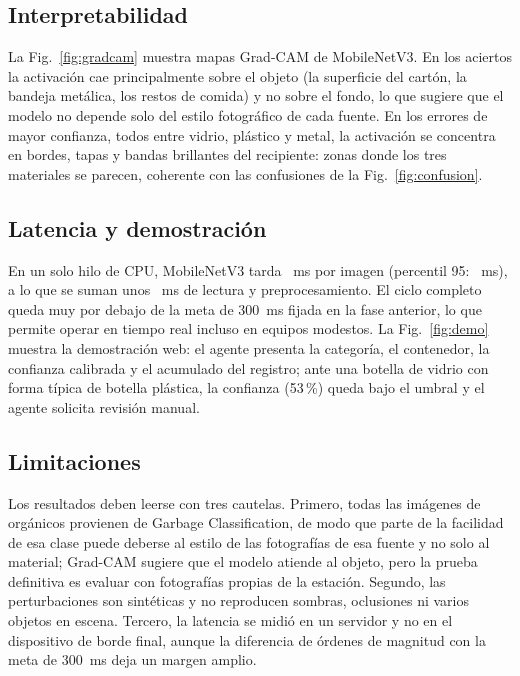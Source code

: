 \documentclass[conference,a4paper]{IEEEtran}
\begin{document}
\subsection{Interpretabilidad}
La Fig.~\ref{fig:gradcam} muestra mapas Grad-CAM de MobileNetV3. En los aciertos la activación cae principalmente sobre el objeto (la superficie del cartón, la bandeja metálica, los restos de comida) y no sobre el fondo, lo que sugiere que el modelo no depende solo del estilo fotográfico de cada fuente. En los errores de mayor confianza, todos entre vidrio, plástico y metal, la activación se concentra en bordes, tapas y bandas brillantes del recipiente: zonas donde los tres materiales se parecen, coherente con las confusiones de la Fig.~\ref{fig:confusion}.


\subsection{Latencia y demostración}
En un solo hilo de CPU, MobileNetV3 tarda \latUnoMN~ms por imagen (percentil 95: \latUnoPnMN~ms), a lo que se suman unos \latPreMN~ms de lectura y preprocesamiento. El ciclo completo queda muy por debajo de la meta de 300~ms fijada en la fase anterior, lo que permite operar en tiempo real incluso en equipos modestos. La Fig.~\ref{fig:demo} muestra la demostración web: el agente presenta la categoría, el contenedor, la confianza calibrada y el acumulado del registro; ante una botella de vidrio con forma típica de botella plástica, la confianza (53\,\%) queda bajo el umbral y el agente solicita revisión manual.


\subsection{Limitaciones}\label{sec:discusion}
Los resultados deben leerse con tres cautelas. Primero, todas las imágenes de orgánicos provienen de Garbage Classification, de modo que parte de la facilidad de esa clase puede deberse al estilo de las fotografías de esa fuente y no solo al material; Grad-CAM sugiere que el modelo atiende al objeto, pero la prueba definitiva es evaluar con fotografías propias de la estación. Segundo, las perturbaciones son sintéticas y no reproducen sombras, oclusiones ni varios objetos en escena. Tercero, la latencia se midió en un servidor y no en el dispositivo de borde final, aunque la diferencia de órdenes de magnitud con la meta de 300~ms deja un margen amplio.

\end{document}
